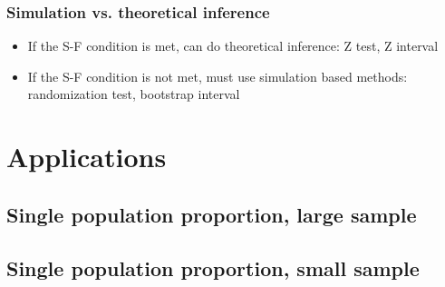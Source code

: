\documentclass[slidestop,compress,mathserif,12pt,t,professionalfonts,xcolor=table]{beamer}
\begin{document}

\begin{frame}
\frametitle{Simulation vs. theoretical inference}

\begin{itemize}

\item If the S-F condition is met, can do theoretical inference: Z test, Z interval

\item If the S-F condition is not met, must use simulation based methods: randomization test, bootstrap interval

\end{itemize}

\end{frame}

\section{Applications}


\subsection{Single population proportion, large sample}


\begin{frame}

\vfill


\vfill

\end{frame}


\begin{frame}

\vfill


\vfill

\end{frame}


\subsection{Single population proportion, small sample}
\end{document}
